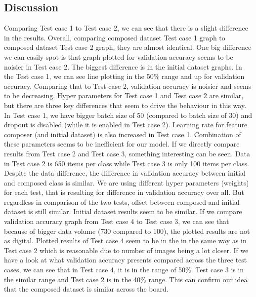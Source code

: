 \subsection{Discussion}
Comparing Test case 1 to Test case 2, we can see that there is a slight difference in the results. Overall, comparing composed dataset Test case 1 graph to composed dataset Test case 2 graph, they are almost identical. One big difference we can easily spot is that graph plotted for validation accuracy seems to be noisier in Test case 2. 
\newline
The biggest difference is in the initial dataset graphs. In the Test case 1, we can see line plotting in the 50\% range and up for validation accuracy. Comparing that to Test case 2, validation accuracy is noisier and seems to be decreasing. 
Hyper parameters for Test case 1 and Test case 2 are similar, but there are three key differences that seem to drive the behaviour in this way. In Test case 1, we have bigger batch size of 50 (compared to batch size of 30) and dropout is disabled (while it is enabled in Test case 2). Learning rate for feature composer (and initial dataset) is also increased in Test case 1. Combination of these parameters seems to be inefficient for our model.
\newline
\newline
If we directly compare results from Test case 2 and Test case 3, something interesting can be seen. Data in Test case 2 is 650 items per class while Test case 3 is only 100 items per class. Despite the data difference, the difference in validation accuracy between initial and composed class is similar. We are using different hyper parameters (weights) for each test, that is resulting for difference in validation accuracy over all. But regardless in comparison of the two tests, offset between composed and initial dataset is still similar.
\newline
\newline
Initial dataset results seem to be similar. If we compare validation accuracy graph from Test case 4 to Test case 3, we can see that because of bigger data volume (730 compared to 100), the plotted results are not as digital. Plotted results of Test case 4 seem to be in the in the same way as in Test case 2 which is reasonable due to number of images being a lot closer. If we have a look at what validation accuracy presents compared across the three test cases, we can see that in Test case 4, it is in the range of 50\%. Test case 3 is in the similar range and Test case 2 is in the 40\% range. This can confirm our idea that the composed dataset is similar across the board. 
